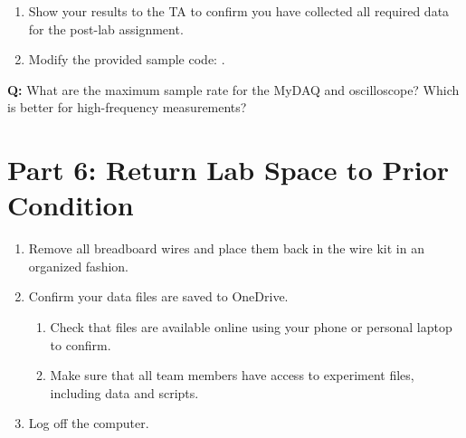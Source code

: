 \documentclass{article} %
\begin{document}
\begin{enumerate}
\begin{itemize}
            \item $1.0 f_N$: At the Nyquist frequency. The signal may appear distorted or ambiguous. This is the critical point where aliasing begins.
            
            \item $1.10 f_N$: Slightly above Nyquist. Determine both the predicted alias frequency (using the folding formula) and the actual observed alias frequency.
            
            \item $2.25 f_N$: Well above Nyquist. Again, determine both the predicted alias frequency and the actual observed alias frequency.
        \end{itemize}
    
    \item Show your results to the TA to confirm you have collected all required data for the post-lab assignment.     
    \item Modify the provided sample code: .
\end{enumerate}

\textbf{Q:} What are the maximum sample rate for the MyDAQ and oscilloscope? Which is better for high-frequency measurements? \\

\section{Part 6: Return Lab Space to Prior Condition}
\begin{enumerate}
    \item Remove all breadboard wires and place them back in the wire kit in an organized fashion.
    \item Confirm your data files are saved to OneDrive.
    \begin{enumerate}[label=\alph*.]
        \item Check that files are available online using your phone or personal laptop to confirm.
        \item Make sure that all team members have access to experiment files, including data and scripts.
    \end{enumerate}
    \item Log off the computer.
\end{enumerate}

\newpage
\end{document}
